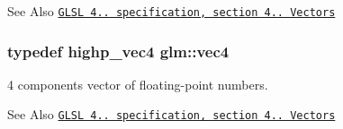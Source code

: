 \begin{DoxySeeAlso}{See Also}
\href{http://www.opengl.org/registry/doc/GLSLangSpec.4.20.8.pdf}{\tt G\-L\-S\-L 4.. specification, section 4.. Vectors} 
\end{DoxySeeAlso}
\hypertarget{group__core__types_ga5881b1b022d7fd1b7218f5916532dd02}{
\subsubsection[{vec4}]{\setlength{\rightskip}{0pt plus 5cm}typedef highp\-\_\-vec4 {\bf glm\-::vec4}}}\label{group__core__types_ga5881b1b022d7fd1b7218f5916532dd02}
4 components vector of floating-\/point numbers.

\begin{DoxySeeAlso}{See Also}
\href{http://www.opengl.org/registry/doc/GLSLangSpec.4.20.8.pdf}{\tt G\-L\-S\-L 4.. specification, section 4.. Vectors} 
\end{DoxySeeAlso}
